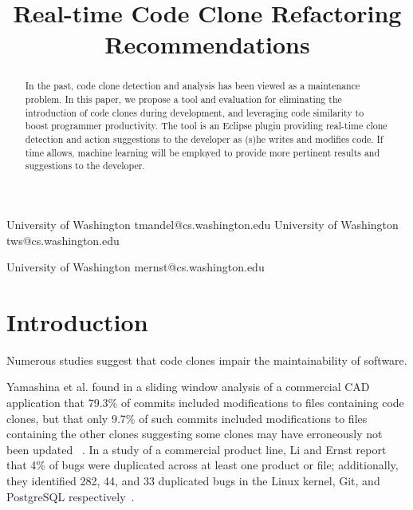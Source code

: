 \documentclass[preprint,10pt]{sigplanconf}
\begin{document}
%

\title{Real-time Code Clone Refactoring Recommendations}
           {University of Washington}
           {tmandel@cs.washington.edu}
           {University of Washington}
           {tws@cs.washington.edu}

           {University of Washington}
           {mernst@cs.washington.edu}

\maketitle
\begin{abstract}
In the past, code clone detection and analysis has been viewed as a
maintenance problem. In this paper, we propose a tool and evaluation
for eliminating the introduction of code clones during development,
and leveraging code similarity to boost programmer productivity. The tool
is an Eclipse plugin providing real-time clone detection and action
suggestions to the developer as (s)he writes and modifies
code. If time allows, machine learning will be 
employed to provide more pertinent results
and suggestions to the developer.
\end{abstract}



\section{Introduction}
\label{sec:intro}
Numerous studies suggest that code clones impair the maintainability
of software.

Yamashina et al. found in a sliding window analysis of a commercial CAD
application that 79.3\% of commits included modifications to files
containing code clones, but that only 9.7\% of such commits included
modifications to files containing the other
clones suggesting some clones may have erroneously not been updated
~\cite{Yamashina2008}. 
In a study of a commercial product line, Li and Ernst report that 4\%
of bugs were duplicated across at least one product or file;
additionally, they identified 282, 44, and 33 duplicated bugs in the
Linux kernel, Git, and PostgreSQL respectively~\cite{LiE2011}.
\end{document}
